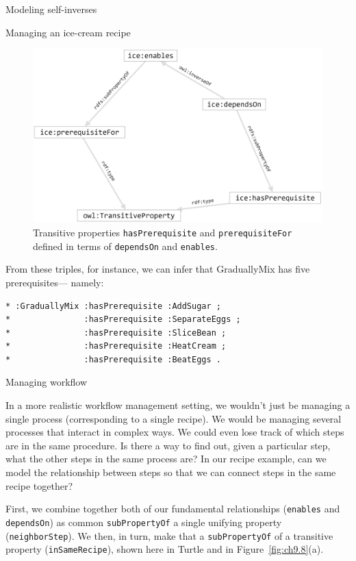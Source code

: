 \begin{challenge}{Modeling self-inverses}
\begin{challenge}{Managing an ice-cream recipe}
\begin{figure}
\centering
\includegraphics[width=5in]{SWWOv3/media/ch9/figure9-7.png}
\caption{Transitive properties \texttt{hasPrerequisite} and \texttt{prerequisiteFor} defined in
terms of \texttt{dependsOn} and \texttt{enables}.
}
\label{fig:ch9.7}
\end{figure}



From these triples, for instance, we can infer that GraduallyMix has
five prerequisites---
namely:

\begin{lstlisting}
* :GraduallyMix :hasPrerequisite :AddSugar ;
*               :hasPrerequisite :SeparateEggs ;
*               :hasPrerequisite :SliceBean ;
*               :hasPrerequisite :HeatCream ;
*               :hasPrerequisite :BeatEggs .
\end{lstlisting}
\end{challenge}


\begin{challenge}{Managing workflow}

In a more realistic workflow management setting, we wouldn't just be
managing a single process (corresponding to a single recipe). We would
be managing several processes that interact in complex ways. We could
even lose track of which steps are in the same procedure. Is there a way
to find out, given a particular step, what the other steps in the same
process are? In our recipe example, can we model the relationship
between steps so that we can connect steps in the same recipe together?

\solution

First, we combine together both of our fundamental relationships
(\texttt{enables} and \texttt{dependsOn}) as common \texttt{subPropertyOf} a single unifying
property (\texttt{neighborStep}). We then, in turn, make that a \texttt{subPropertyOf} of
a transitive property (\texttt{inSameRecipe}), shown here in Turtle and in Figure~\ref{fig:ch9.8}(a).


\end{challenge}
\end{challenge}
